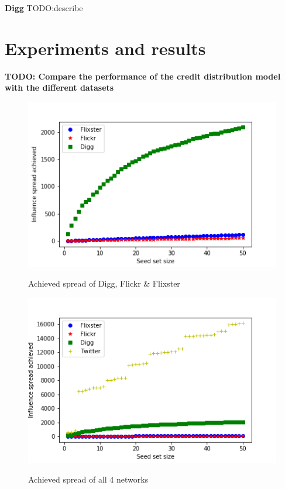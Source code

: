 \documentclass{acm_proc_article-sp}
\begin{document}
\textbf{Digg} \cite{data:digg-friends,data:digg-votes,data:digg} TODO:describe \cite{DBLP:journals/corr/abs-1202-3162}


 \cite{DBLP:journals/corr/abs-1202-3162}


\section{Experiments and results}
\textbf{TODO: Compare the performance of the credit distribution model with the different datasets}

\begin{figure}[h]
	\includegraphics[width=\linewidth]{spread_3.png}
	\centering
	\label{spread3}
    \caption{Achieved spread of Digg, Flickr \& Flixster}
\end{figure}


\begin{figure}[h]
	\includegraphics[width=\linewidth]{spread_achieved.png}
	\centering
	\label{spreadall}
    \caption{Achieved spread of all 4 networks}
\end{figure}
\end{document}
